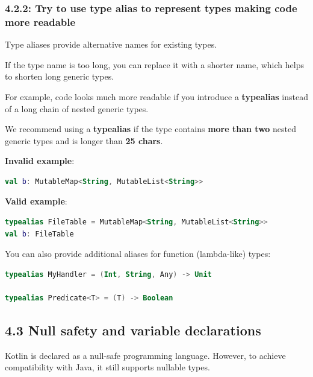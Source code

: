 \subsubsection*{\textbf{4.2.2: Try to use type alias to represent types making code more readable}}
\leavevmode\newline

\label{sec:4.2.2}



Type aliases provide alternative names for existing types.

If the type name is too long, you can replace it with a shorter name, which helps to shorten long generic types.

For example, code looks much more readable if you introduce a \textbf{typealias} instead of a long chain of nested generic types.

We recommend using a \textbf{typealias} if the type contains \textbf{more than two} nested generic types and is longer than \textbf{25 chars}.



\textbf{Invalid example}:

\begin{lstlisting}[language=Kotlin]
val b: MutableMap<String, MutableList<String>>
\end{lstlisting}


\textbf{Valid example}:

\begin{lstlisting}[language=Kotlin]
typealias FileTable = MutableMap<String, MutableList<String>>
val b: FileTable
\end{lstlisting}


You can also provide additional aliases for function (lambda-like) types:

\begin{lstlisting}[language=Kotlin]
typealias MyHandler = (Int, String, Any) -> Unit

typealias Predicate<T> = (T) -> Boolean
\end{lstlisting}


\subsection*{\textbf{4.3 Null safety and variable declarations}}

\label{sec:4.3}

Kotlin is declared as a null-safe programming language. However, to achieve compatibility with Java, it still supports nullable types.



